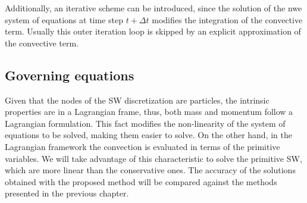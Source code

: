 Additionally, an iterative scheme can be introduced, since the solution of the nwe system of equations at time step $t + \Delta t$ modifies the integration of the convective term. Usually this outer iteration loop is skipped by an explicit approximation of the convective term.





\subsection{Governing equations}


Given that the nodes of the SW discretization are particles, the intrinsic properties are in a Lagrangian frame, thus, both mass and momentum follow a Lagrangian formulation. This fact modifies the non-linearity of the system of equations to be solved, making them easier to solve. On the other hand, in the Lagrangian framework the convection is evaluated in terms of the primitive variables. We will take advantage of this characteristic to solve the primitive SW, which are more linear than the conservative ones.
The accuracy of the solutions obtained with the proposed method will be compared against the methods presented in the previous chapter.





